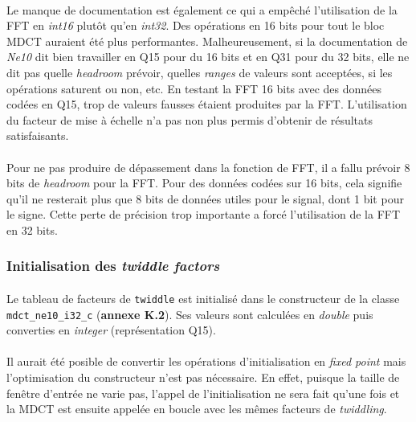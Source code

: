 \documentclass{article}
\begin{document}
    \paragraph{}
    Le manque de documentation est également ce qui a empêché l'utilisation de la FFT en \emph{int16} plutôt qu'en \emph{int32}. Des opérations en 16 bits pour tout le bloc MDCT auraient été plus performantes. Malheureusement, si la documentation de \emph{Ne10} dit bien travailler en Q15 pour du 16 bits et en Q31 pour du 32 bits, elle ne dit pas quelle \emph{headroom} prévoir, quelles \emph{ranges} de valeurs sont acceptées, si les opérations saturent ou non, etc. En testant la FFT 16 bits avec des données codées en Q15, trop de valeurs fausses étaient produites par la FFT. L'utilisation du facteur de mise à échelle n'a pas non plus permis d'obtenir de résultats satisfaisants.

    \paragraph{}
    Pour ne pas produire de dépassement dans la fonction de FFT, il a fallu prévoir 8 bits de \emph{headroom} pour la FFT. Pour des données codées sur 16 bits, cela signifie qu'il ne resterait plus que 8 bits de données utiles pour le signal, dont 1 bit pour le signe. Cette perte de précision trop importante a forcé l'utilisation de la FFT en 32 bits.


    \subsubsection{Initialisation des \emph{twiddle factors}}
    \paragraph{}
    Le tableau de facteurs de \texttt{twiddle} est initialisé dans le constructeur de la classe \texttt{mdct\_ne10\_i32\_c} (\textbf{annexe K.2}). Ses valeurs sont calculées en \emph{double} puis converties en \emph{integer} (représentation Q15).
    
    \paragraph{}
    Il aurait été posible de convertir les opérations d'initialisation en \emph{fixed point} mais l'optimisation du constructeur n'est pas nécessaire. En effet, puisque la taille de fenêtre d'entrée ne varie pas, l'appel de l'initialisation ne sera fait qu'une fois et la MDCT est ensuite appelée en boucle avec les mêmes facteurs de \emph{twiddling}.
\end{document}
